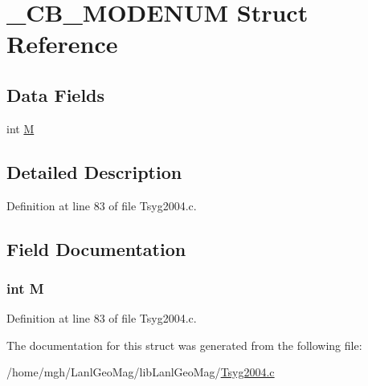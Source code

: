 \hypertarget{struct___c_b___m_o_d_e_n_u_m}{
\section{\_\-CB\_\-MODENUM Struct Reference}
\label{struct___c_b___m_o_d_e_n_u_m}
}
\subsection*{Data Fields}
\begin{CompactItemize}
\item 
int \hyperlink{struct___c_b___m_o_d_e_n_u_m_5e78dbd5fd0fc01ba7b98dd15e27221e}{M}
\end{CompactItemize}


\subsection{Detailed Description}


Definition at line 83 of file Tsyg2004.c.

\subsection{Field Documentation}
\hypertarget{struct___c_b___m_o_d_e_n_u_m_5e78dbd5fd0fc01ba7b98dd15e27221e}{
\subsubsection[{M}]{\setlength{\rightskip}{0pt plus 5cm}int {\bf M}}}
\label{struct___c_b___m_o_d_e_n_u_m_5e78dbd5fd0fc01ba7b98dd15e27221e}




Definition at line 83 of file Tsyg2004.c.

The documentation for this struct was generated from the following file:\begin{CompactItemize}
\item 
/home/mgh/LanlGeoMag/libLanlGeoMag/\hyperlink{_tsyg2004_8c}{Tsyg2004.c}\end{CompactItemize}
